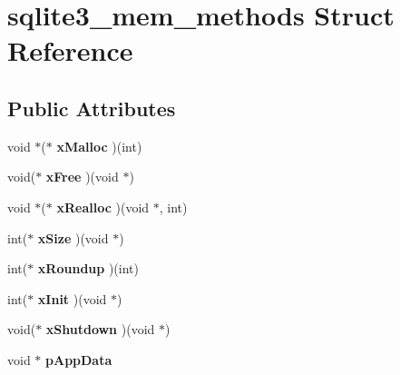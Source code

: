 \hypertarget{structsqlite3__mem__methods}{\section{sqlite3\-\_\-mem\-\_\-methods Struct Reference}
\label{structsqlite3__mem__methods}
}
\subsection*{Public Attributes}
\begin{DoxyCompactItemize}
\item 
\hypertarget{structsqlite3__mem__methods_acb9151cf501c851b61ab6b378832b159}{void $\ast$($\ast$ {\bfseries x\-Malloc} )(int)}\label{structsqlite3__mem__methods_acb9151cf501c851b61ab6b378832b159}

\item 
\hypertarget{structsqlite3__mem__methods_aa2e7fe8d030adaa17fd23a44fec1eca1}{void($\ast$ {\bfseries x\-Free} )(void $\ast$)}\label{structsqlite3__mem__methods_aa2e7fe8d030adaa17fd23a44fec1eca1}

\item 
\hypertarget{structsqlite3__mem__methods_a5bb7e62164d0934888473c618c61dc77}{void $\ast$($\ast$ {\bfseries x\-Realloc} )(void $\ast$, int)}\label{structsqlite3__mem__methods_a5bb7e62164d0934888473c618c61dc77}

\item 
\hypertarget{structsqlite3__mem__methods_a6c68275b577d66ae659ef30344c8f86c}{int($\ast$ {\bfseries x\-Size} )(void $\ast$)}\label{structsqlite3__mem__methods_a6c68275b577d66ae659ef30344c8f86c}

\item 
\hypertarget{structsqlite3__mem__methods_a8b3f0d1ddeb498c4aaf9bbce5b92a268}{int($\ast$ {\bfseries x\-Roundup} )(int)}\label{structsqlite3__mem__methods_a8b3f0d1ddeb498c4aaf9bbce5b92a268}

\item 
\hypertarget{structsqlite3__mem__methods_ad0997b548928358d655000b6ac825cf4}{int($\ast$ {\bfseries x\-Init} )(void $\ast$)}\label{structsqlite3__mem__methods_ad0997b548928358d655000b6ac825cf4}

\item 
\hypertarget{structsqlite3__mem__methods_a6f48100692bd935d7f3dbb8c701ab6ca}{void($\ast$ {\bfseries x\-Shutdown} )(void $\ast$)}\label{structsqlite3__mem__methods_a6f48100692bd935d7f3dbb8c701ab6ca}

\item 
\hypertarget{structsqlite3__mem__methods_af91b7adfa1f6aace0b129bac800bd444}{void $\ast$ {\bfseries p\-App\-Data}}\label{structsqlite3__mem__methods_af91b7adfa1f6aace0b129bac800bd444}

\end{DoxyCompactItemize}


